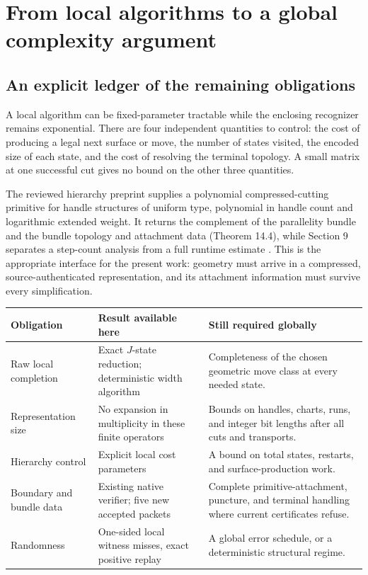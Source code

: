 \section{From local algorithms to a global complexity argument}
\label{sec:global}

\subsection{An explicit ledger of the remaining obligations}

A local algorithm can be fixed-parameter tractable while the enclosing
recognizer remains exponential.  There are four independent quantities to
control: the cost of producing a legal next surface or move, the number of
states visited, the encoded size of each state, and the cost of resolving
the terminal topology.  A small matrix at one successful cut gives no bound
on the other three quantities.

The reviewed hierarchy preprint supplies a polynomial compressed-cutting
primitive for handle structures of uniform type, polynomial in handle count
and logarithmic extended weight.  It returns the complement of the parallelity
bundle and the bundle topology and attachment data (Theorem 14.4), while
Section 9 separates a step-count analysis from
a full runtime estimate \cite{Lackenby2026}.  This is the appropriate
interface for the present work: geometry must arrive in a compressed,
source-authenticated representation, and its attachment information must
survive every simplification.

\begin{center}
\begin{tabular}{P{0.25\textwidth}P{0.31\textwidth}P{0.33\textwidth}}
\toprule
Obligation & Result available here & Still required globally\\
\midrule
Raw local completion & Exact $J$-state reduction; deterministic width
algorithm & Completeness of the chosen geometric move class at every
needed state.\\
Representation size & No expansion in multiplicity in these finite
operators & Bounds on handles, charts, runs, and integer bit lengths
after all cuts and transports.\\
Hierarchy control & Explicit local cost parameters & A bound on total
states, restarts, and surface-production work.\\
Boundary and bundle data & Existing native verifier; five new accepted
packets & Complete primitive-attachment, puncture, and terminal handling
where current certificates refuse.\\
Randomness & One-sided local witness misses, exact positive replay & A
global error schedule, or a deterministic structural regime.\\
\bottomrule
\end{tabular}
\end{center}

